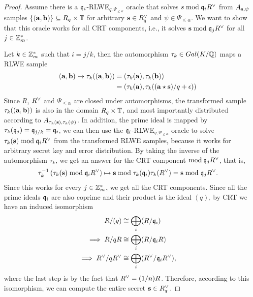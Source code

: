 \documentclass[../main.tex]{subfiles}
\begin{document}
\begin{proof}
Assume there is a  $\mathfrak{q}_i$-RLWE$_{q,\Psi_{\le \alpha}}$ oracle that solves $s \bmod \mathfrak{q}_i R^{\vee}$ from $A_{\mathbf{s}, \psi}$ samples $\{(\mathbf{a},\mathbf{b})\} \subseteq R_q \times \mathbb{T}$ for arbitrary $\mathbf{s} \in R^{\vee}_q$ and $\psi \in \Psi_{\le \alpha}$. We want to show that this oracle works for all CRT components, i.e., it solves $\mathbf{s} \bmod \mathfrak{q}_j R^{\vee}$ for all $j \in \mathbb{Z}_m^*$.

Let $k \in \mathbb{Z}_m^*$ such that $i=j/k$, then the automorphism $\tau_k \in Gal(K/\mathbb{Q})$ maps a RLWE sample 
\begin{align*}
    (\mathbf{a},\mathbf{b}) \mapsto \tau_k((\mathbf{a},\mathbf{b})) &= (\tau_k(\mathbf{a}),\tau_k(\mathbf{b}))\\
    &= (\tau_k(\mathbf{a}),\tau_k((\mathbf{a} \star \mathbf{s})/q+\mathbf{\epsilon}))
\end{align*}
Since $R$, $R^{\vee}$ and $\Psi_{\le \alpha}$ are closed under automorphisms, the transformed sample $\tau_k((\mathbf{a},\mathbf{b}))$ is also in the domain $R_q \times \mathbb{T}$, and most importantly distributed according to $A_{\tau_k(\mathbf{s}), \tau_k(\psi)}$.  
In addition, the prime ideal is mapped by $\tau_k(\mathfrak{q}_j) = \mathfrak{q}_{j/k}=\mathfrak{q}_i$, we can then use the $\mathfrak{q}_i$-RLWE$_{q,\Psi_{\le \alpha}}$ oracle to solve $\tau_k(\mathbf{s}) \bmod \mathfrak{q}_i R^{\vee}$ from the transformed RLWE samples, because it works for arbitrary secret key and error distribution. By taking the inverse of the automorphism $\tau_k$, we get an answer for the CRT component $\bmod \,\mathfrak{q}_j R^{\vee}$, that is, 
\begin{align*}
    \tau^{-1}_k \left(\tau_k(\mathbf{s}) \bmod \mathfrak{q}_i R^{\vee}\right) \mapsto \mathbf{s} \bmod \tau_k(\mathfrak{q}_i)\tau_k(R^{\vee})= \mathbf{s} \bmod \mathfrak{q}_j R^{\vee}.
\end{align*}
Since this works for every $j \in \mathbb{Z}_m^*$, we get all the CRT components. Since all the prime ideals $\mathfrak{q}_i$ are also coprime and their product is the ideal $(q)$, by CRT we have an induced isomorphism 
\begin{align*}
    R/(q) &\cong \bigoplus_i (R/\mathfrak{q}_i) \\
    \implies R/qR &\cong \bigoplus_i (R/\mathfrak{q}_i R) \\
    \implies R^{\vee}/qR^{\vee} &\cong \bigoplus_i (R^{\vee}/\mathfrak{q}_i R^{\vee}),
\end{align*}
where the last step is by the fact that $R^{\vee}=(1/n) R$. Therefore, according to this isomorphism, we can compute the entire secret $\mathbf{s} \in R^{\vee}_q$. %
\end{proof}
\end{document}
